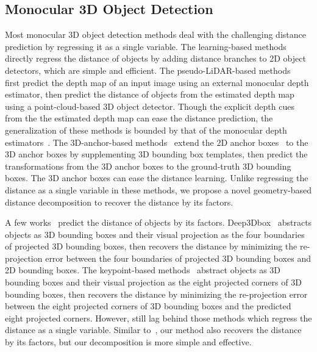 \documentclass[10pt,twocolumn,letterpaper]{article}
\begin{document}
\subsection{Monocular 3D Object Detection}

Most monocular 3D object detection methods deal with the challenging distance prediction by regressing it as a single variable. The learning-based methods~\cite{DBLP:journals/corr/abs-1904-07850,DBLP:conf/cvpr/ChenTSL20,DBLP:conf/iccv/SimonelliBPLK19,DBLP:conf/eccv/SimonelliBPRK20} directly regress the distance of objects by adding distance branches to 2D object detectors, which are simple and efficient. The pseudo-LiDAR-based methods~\cite{DBLP:conf/cvpr/WangCGHCW19,DBLP:conf/iccv/MaWLZOF19,DBLP:conf/eccv/YeDSLTFDW20} first predict the depth map of an input image using an external monocular depth estimator, then predict the distance of objects from the estimated depth map using a point-cloud-based 3D object detector. Though the explicit depth cues from the the estimated depth map can ease the distance prediction, the generalization of these methods is bounded by that of the monocular depth estimators~\cite{DBLP:journals/corr/abs-2012-05796}. The 3D-anchor-based methods~\cite{DBLP:conf/iccv/Brazil019,DBLP:conf/eccv/BrazilPLS20,DBLP:conf/cvpr/DingHYWSLL20a} extend the 2D anchor boxes~\cite{DBLP:conf/nips/RenHGS15} to the 3D anchor boxes by supplementing 3D bounding box templates, then predict the transformations from the 3D anchor boxes to the ground-truth 3D bounding boxes. The 3D anchor boxes can ease the distance learning. Unlike regressing the distance as a single variable in these methods, we propose a novel geometry-based distance decomposition to recover the distance by its factors.

A few works~\cite{DBLP:conf/cvpr/MousavianAFK17,DBLP:journals/corr/abs-1906-08070,DBLP:conf/eccv/LiZLC20} predict the distance of objects by its factors. 
Deep3Dbox~\cite{DBLP:conf/cvpr/MousavianAFK17} abstracts objects as 3D bounding boxes and their visual projection as the four boundaries of projected 3D bounding boxes, then recovers the distance by minimizing the re-projection error between the four boundaries of projected 3D bounding boxes and 2D bounding boxes. The keypoint-based methods~\cite{DBLP:journals/corr/abs-1906-08070,DBLP:conf/eccv/LiZLC20} abstract objects as 3D bounding boxes and their visual projection as the eight projected corners of 3D bounding boxes, then recovers the distance by minimizing the re-projection error between the eight projected corners of 3D bounding boxes and the predicted eight projected corners. However, \cite{DBLP:conf/cvpr/MousavianAFK17,DBLP:journals/corr/abs-1906-08070,DBLP:conf/eccv/LiZLC20} still lag behind those methods which regress the distance as a single variable. Similar to~\cite{DBLP:conf/cvpr/MousavianAFK17,DBLP:journals/corr/abs-1906-08070,DBLP:conf/eccv/LiZLC20}, our method also recovers the distance by its factors, but our decomposition is more simple and effective.
\end{document}
